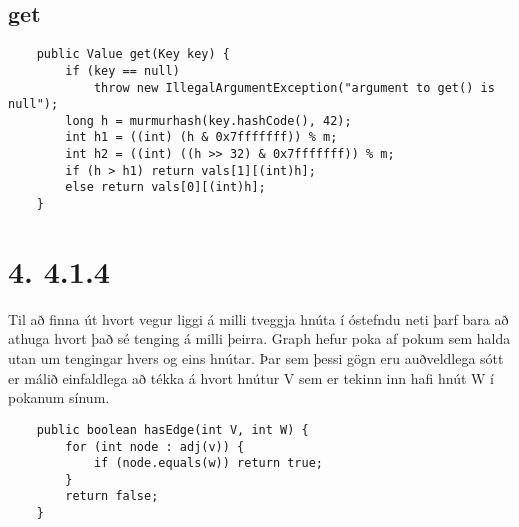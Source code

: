 \documentclass{article}
\begin{document}
\subsection*{get}
\begin{lstlisting}
    public Value get(Key key) {
        if (key == null)
            throw new IllegalArgumentException("argument to get() is null");
        long h = murmurhash(key.hashCode(), 42);
        int h1 = ((int) (h & 0x7fffffff)) % m;
        int h2 = ((int) ((h >> 32) & 0x7fffffff)) % m;
        if (h > h1) return vals[1][(int)h];
        else return vals[0][(int)h];
    }
\end{lstlisting}

\section*{4. 4.1.4}
Til að finna út hvort vegur liggi á milli tveggja hnúta í óstefndu neti þarf bara að athuga hvort það sé tenging á milli þeirra.
Graph hefur poka af pokum sem halda utan um tengingar hvers og eins hnútar. 
Þar sem þessi gögn eru auðveldlega sótt er málið einfaldlega að tékka á hvort hnútur V sem er tekinn inn hafi hnút W í pokanum sínum.

\begin{lstlisting}
    public boolean hasEdge(int V, int W) {
        for (int node : adj(v)) {
            if (node.equals(w)) return true;
        }
        return false;
    }
\end{lstlisting}
\end{document}
